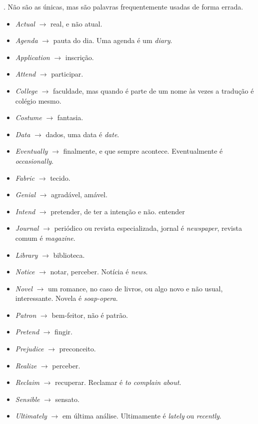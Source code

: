 \documentclass{article}
\begin{document}
. Não são as únicas, mas são palavras frequentemente usadas de forma errada.
\begin{itemize}
    \item \textit{Actual} $\rightarrow$ real, e não atual.
    \item \textit{Agenda} $\rightarrow$ pauta do dia. Uma agenda é um \textit{diary}.
    \item \textit{Application} $\rightarrow$ inscrição.
    \item \textit{Attend} $\rightarrow$ participar.
    \item \textit{College} $\rightarrow$ faculdade, mas quando é parte de um nome às vezes a tradução é colégio mesmo.
    \item \textit{Costume} $\rightarrow$ fantasia.
    \item \textit{Data} $\rightarrow$ dados, uma data é \textit{date}.
    \item \textit{Eventually} $\rightarrow$ finalmente, e que sempre acontece. Eventualmente é \textit{occasionally}.
    \item \textit{Fabric} $\rightarrow$ tecido.
    \item \textit{Genial} $\rightarrow$ agradável, amável.
    \item \textit{Intend} $\rightarrow$ pretender, de ter a intenção e não. entender
    \item \textit{Journal} $\rightarrow$ periódico ou revista especializada, jornal é \textit{newspaper}, revista comum é \textit{magazine}.
    \item \textit{Library} $\rightarrow$ biblioteca.
    \item \textit{Notice} $\rightarrow$ notar, perceber. Notícia é \textit{news}.
    \item \textit{Novel} $\rightarrow$ um romance, no caso de livros, ou algo novo e não usual, interessante. Novela é \textit{soap-opera}.
    \item \textit{Patron} $\rightarrow$ bem-feitor, não é patrão.
    \item \textit{Pretend} $\rightarrow$ fingir.
    \item \textit{Prejudice} $\rightarrow$ preconceito.
    \item \textit{Realize} $\rightarrow$ perceber.
    \item \textit{Reclaim} $\rightarrow$ recuperar. Reclamar é \textit{to complain about}.
    \item \textit{Sensible} $\rightarrow$ sensato.
    \item \textit{Ultimately} $\rightarrow$ em última análise. Ultimamente é \textit{lately} ou \textit{recently}.
    \end{itemize}
    
\end{document}
